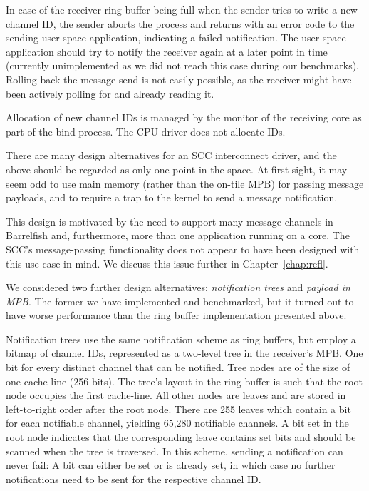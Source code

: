 \documentclass[a4paper,twoside]{report} %
\begin{document}
In case of the receiver ring buffer being full when the sender tries
to write a new channel ID, the sender aborts the process and returns
with an error code to the sending user-space application, indicating a
failed notification. The user-space application should try to notify
the receiver again at a later point in time (currently unimplemented
as we did not reach this case during our benchmarks). Rolling back the
message send is not easily possible, as the receiver might have been
actively polling for and already reading it.

Allocation of new channel IDs is managed by the monitor of the
receiving core as part of the bind process. The CPU driver does not
allocate IDs.

There are many design alternatives for an SCC interconnect driver, and
the above should be regarded as only one point in the space.  At first
sight, it may seem odd to use main memory (rather than the on-tile
MPB) for passing message payloads, and to require a trap to the kernel
to send a message notification.

This design is motivated by the need to support many message channels
in Barrelfish and, furthermore, more than one application running on a
core.  The SCC's message-passing functionality does not appear to have
been designed with this use-case in mind.
We discuss this issue further in Chapter~\ref{chap:refl}. 

We considered two further design alternatives: \emph{notification
  trees} and \emph{payload in MPB}. The former we have implemented and
benchmarked, but it turned out to have worse performance than the ring
buffer implementation presented above.

Notification trees use the same notification scheme as ring buffers,
but employ a bitmap of channel IDs, represented as a two-level tree in
the receiver's MPB. One bit for every distinct channel that can be
notified. Tree nodes are of the size of one cache-line (256 bits). The
tree's layout in the ring buffer is such that the root node occupies
the first cache-line. All other nodes are leaves and are stored in
left-to-right order after the root node. There are 255 leaves which
contain a bit for each notifiable channel, yielding 65,280 notifiable
channels. A bit set in the root node indicates that the corresponding
leave contains set bits and should be scanned when the tree is
traversed. In this scheme, sending a notification can never fail: A
bit can either be set or is already set, in which case no further
notifications need to be sent for the respective channel ID.
\end{document}

